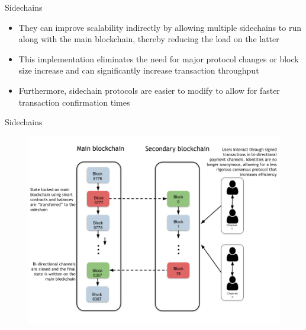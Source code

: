 \documentclass[9pt]{beamer}
\begin{document}

\begin{frame}{Sidechains}
	\begin{itemize}
		\item They can improve scalability indirectly by allowing multiple sidechains to run along with the main blockchain, thereby reducing the load on the latter
		\item This implementation eliminates the need for major protocol changes or block size increase and can significantly increase transaction throughput
		\item Furthermore, sidechain protocols are easier to modify to allow for faster transaction confirmation times
	\end{itemize}
\end{frame}


\begin{frame}{Sidechains}
	\begin{figure}[]
		\centering
		\includegraphics  [scale=0.3]{Images/sidechain}
	\end{figure}
\end{frame}

\end{document}
